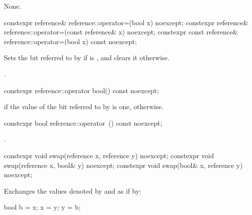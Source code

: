 \begin{itemdescr}
\pnum
\effects
None.
\end{itemdescr}

%
\begin{itemdecl}
constexpr reference& reference::operator=(bool x) noexcept;
constexpr reference& reference::operator=(const reference& x) noexcept;
constexpr const reference& reference::operator=(bool x) const noexcept;
\end{itemdecl}

\begin{itemdescr}
\pnum
\effects
Sets the bit referred to by  if  is ,
and clears it otherwise.

\pnum
\returns
{}.
\end{itemdescr}

%
\begin{itemdecl}
constexpr reference::operator bool() const noexcept;
\end{itemdecl}

\begin{itemdescr}
\pnum
\returns
{} if the value of the bit referred to by  is one,
 otherwise.
\end{itemdescr}

%
\begin{itemdecl}
constexpr bool reference::operator~() const noexcept;
\end{itemdecl}

\begin{itemdescr}
\pnum
\returns
{}.
\end{itemdescr}

%
\begin{itemdecl}
constexpr void swap(reference x, reference y) noexcept;
constexpr void swap(reference x, bool& y) noexcept;
constexpr void swap(bool& x, reference y) noexcept;
\end{itemdecl}

\begin{itemdescr}
\pnum
\effects
Exchanges the values denoted by  and  as if by:

\begin{codeblock}
bool b = x;
x = y;
y = b;
\end{codeblock}
\end{itemdescr}

